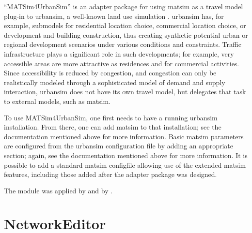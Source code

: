 ``MATSim4UrbanSim'' is an adapter package for using \gls{matsim} as a travel model plug-in to \acrshort{urbansim}, a well-known land use simulation \citep[e.g.][see \url{http://www.urbansim.org}]{WaddellEtc2003UrbanSim}.
\gls{urbansim} has, for example, submodels for residential location choice, commercial location choice, or development and building construction, thus creating synthetic  potential urban or regional development scenarios under various conditions and constraints. 
Traffic infrastructure plays a significant role in such developments; for example, very accessible areas are more attractive as residences and for commercial activities. 
Since accessibility is reduced by congestion, and congestion can only be realistically modeled through a sophisticated model of demand and supply interaction, \gls{urbansim} does not have its own travel model, but delegates that task to external models, such as \gls{matsim}.

To use MATSim4UrbanSim, one first needs to have a running \gls{urbansim} installation. 
From there, one can add \gls{matsim} to that installation; see %
the documentation mentioned above for more information. 
Basic \gls{matsim} parameters are configured from the \gls{urbansim} configuration file by adding an appropriate section; again, see 
the documentation mentioned above for more information. 
It is possible to add a standard \gls{matsim} \gls{configfile} allowing use of the extended \gls{matsim} features, including those added after the adapter package was designed.

The module was applied by \citet{CabritaEtcSustaincityHandbookBrusselsChapter} and by \citet[][]{ZoelligRenner_PhDThesis_2014}.

\section{NetworkEditor}
\label{sec:contrib-networkEditor}

